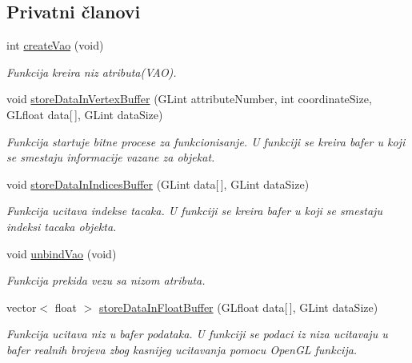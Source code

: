 \subsection*{Privatni članovi}
\begin{DoxyCompactItemize}
\item 
int \hyperlink{classcore_1_1VaoLoader_af76598a15d38378e594778d9a63a7a6a}{create\+Vao} (void)
\begin{DoxyCompactList}\small\item\em Funkcija kreira niz atributa(\+V\+A\+O). \end{DoxyCompactList}\item 
void \hyperlink{classcore_1_1VaoLoader_a234b87947a46ffcaea7dc6de09185a41}{store\+Data\+In\+Vertex\+Buffer} (G\+Lint attribute\+Number, int coordinate\+Size, G\+Lfloat data\mbox{[}$\,$\mbox{]}, G\+Lint data\+Size)
\begin{DoxyCompactList}\small\item\em Funkcija startuje bitne procese za funkcionisanje. U funkciji se kreira bafer u koji se smestaju informacije vazane za objekat. \end{DoxyCompactList}\item 
void \hyperlink{classcore_1_1VaoLoader_a7195d251490976b2053548e19b7c6f1d}{store\+Data\+In\+Indices\+Buffer} (G\+Lint data\mbox{[}$\,$\mbox{]}, G\+Lint data\+Size)
\begin{DoxyCompactList}\small\item\em Funkcija ucitava indekse tacaka. U funkciji se kreira bafer u koji se smestaju indeksi tacaka objekta. \end{DoxyCompactList}\item 
void \hyperlink{classcore_1_1VaoLoader_a8876e8e71b0299c47406afc7a2cb6d81}{unbind\+Vao} (void)
\begin{DoxyCompactList}\small\item\em Funkcija prekida vezu sa nizom atributa. \end{DoxyCompactList}\item 
vector$<$ float $>$ \hyperlink{classcore_1_1VaoLoader_a016f118749e83bbf79e6d0f2c9bf9209}{store\+Data\+In\+Float\+Buffer} (G\+Lfloat data\mbox{[}$\,$\mbox{]}, G\+Lint data\+Size)
\begin{DoxyCompactList}\small\item\em Funkcija ucitava niz u bafer podataka. U funkciji se podaci iz niza ucitavaju u bafer realnih brojeva zbog kasnijeg ucitavanja pomocu Open\+GL funkcija. \end{DoxyCompactList}\item 

\end{DoxyCompactItemize}
